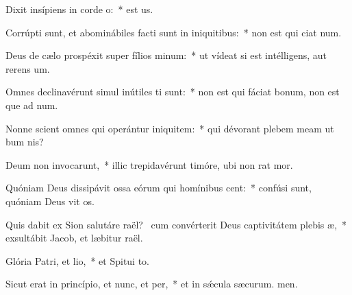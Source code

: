 \item Dixit insípiens in corde o:~*  est us.
\item Corrúpti sunt, et abominábiles facti sunt in iniquitibus:~* non est qui ciat num.
\item Deus de cælo prospéxit super fílios minum:~* ut vídeat si est intélligens, aut rerens um.
\item Omnes declinavérunt simul inútiles ti sunt:~* non est qui fáciat bonum, non est que ad num.
\item Nonne scient omnes qui operántur iniquitem:~* qui dévorant plebem meam ut bum nis?
\item Deum non invocarunt,~* illic trepidavérunt timóre, ubi non rat mor.
\item Quóniam Deus dissipávit ossa eórum qui homínibus cent:~* confúsi sunt, quóniam Deus vit os.
\item Quis dabit ex Sion salutáre raël?~\pscross{} cum convérterit Deus captivitátem plebis æ,~* exsultábit Jacob, et læbitur raël.
\item Glória Patri, et lio,~* et Spitui to.
\item Sicut erat in princípio, et nunc, et per,~* et in sǽcula sæcurum. men.
